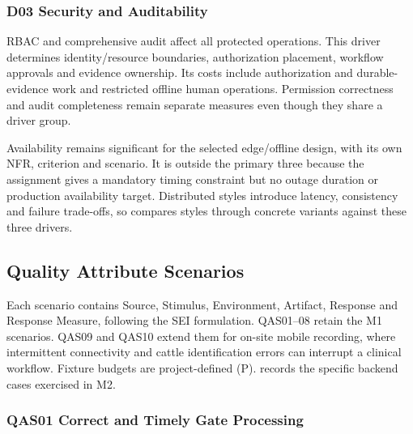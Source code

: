 \subsubsection{D03 Security and Auditability}\label{sec:3.3.3}

RBAC and comprehensive audit affect all protected operations. This
driver determines identity/resource boundaries, authorization placement,
workflow approvals and evidence ownership. Its costs include
authorization and durable-evidence work and restricted offline human
operations. Permission correctness and audit completeness remain
separate measures even though they share a driver group.

Availability remains significant for the selected edge/offline design,
with its own NFR, criterion and scenario. It is outside the primary
three because the assignment gives a mandatory timing constraint but no
outage duration or production availability target. Distributed styles
introduce latency, consistency and failure trade-offs, so 
compares styles through concrete variants against these three drivers.

\subsection{Quality Attribute Scenarios}\label{sec:3.4}

Each scenario contains Source, Stimulus, Environment, Artifact, Response
and Response Measure, following the SEI formulation. QAS01--08 retain
the M1 scenarios. QAS09 and QAS10 extend them for on-site mobile
recording, where intermittent connectivity and cattle identification
errors can interrupt a clinical workflow.\cite{assignmentM2} Fixture
budgets are project-defined (P).  records the
specific backend cases exercised in M2.

\subsubsection{QAS01 Correct and Timely Gate Processing}\label{sec:3.4.1}

